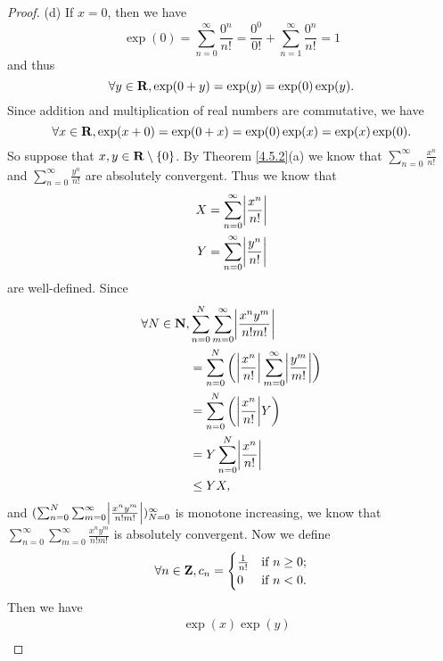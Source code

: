 \begin{proof}{(d)}
    If \(x = 0\), then we have
    \[
        \exp(0) = \sum_{n = 0}^\infty \frac{0^n}{n!} = \frac{0^0}{0!} + \sum_{n = 1}^\infty \frac{0^n}{n!} = 1
    \]
    and thus
    \[
        \forall y \in \mathbf{R}, \exp(0 + y) = \exp(y) = \exp(0) \exp(y).
    \]
    Since addition and multiplication of real numbers are commutative, we have
    \[
        \forall x \in \mathbf{R}, \exp(x + 0) = \exp(0 + x) = \exp(0) \exp(x) = \exp(x) \exp(0).
    \]
    So suppose that \(x, y \in \mathbf{R} \setminus \{0\}\).
    By Theorem \ref{4.5.2}(a) we know that \(\sum_{n = 0}^\infty \frac{x^n}{n!}\) and \(\sum_{n = 0}^\infty \frac{y^n}{n!}\) are absolutely convergent.
    Thus we know that
    \begin{align*}
        X & = \sum_{n = 0}^\infty \abs{\frac{x^n}{n!}} \\
        Y & = \sum_{n = 0}^\infty \abs{\frac{y^n}{n!}}
    \end{align*}
    are well-defined.
    Since
    \begin{align*}
        \forall N \in \N, & \sum_{n = 0}^N \sum_{m = 0}^\infty \abs{\frac{x^n y^m}{n! m!}}                             \\
                          & = \sum_{n = 0}^N \bigg(\abs{\frac{x^n}{n!}} \sum_{m = 0}^\infty \abs{\frac{y^m}{m!}}\bigg) \\
                          & = \sum_{n = 0}^N \bigg(\abs{\frac{x^n}{n!}} Y\bigg)                                        \\
                          & = Y \sum_{n = 0}^N \abs{\frac{x^n}{n!}}                                                    \\
                          & \leq Y X,
    \end{align*}
    and \((\sum_{n = 0}^N \sum_{m = 0}^\infty \abs{\frac{x^n y^m}{n! m!}})_{N = 0}^\infty\) is monotone increasing, we know that \(\sum_{n = 0}^\infty \sum_{m = 0}^\infty \frac{x^n y^m}{n! m!}\) is absolutely convergent.
    Now we define
    \[
        \forall n \in \mathbf{Z}, c_n = \begin{cases}
            \frac{1}{n!} & \text{if } n \geq 0; \\
            0            & \text{if } n < 0.
        \end{cases}
    \]
    Then we have
    \begin{align*}
         & \exp(x) \exp(y)                                                                                                                            \\

\end{align*}
\end{proof}
